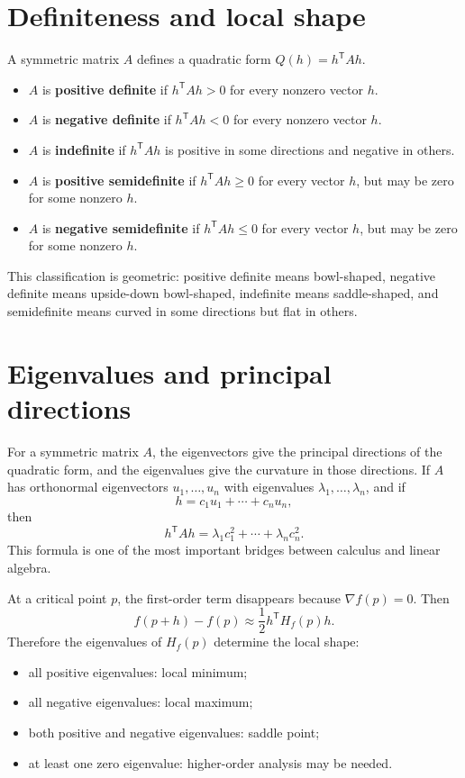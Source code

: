 \documentclass[11pt]{article}
\newcommand{\grad}{\nabla}
\newcommand{\T}{^{\mathsf T}}
\begin{document}
\section{Definiteness and local shape}

A symmetric matrix $A$ defines a quadratic form $Q(h)=h\T Ah$.
\begin{itemize}
  \item $A$ is \textbf{positive definite} if $h\T Ah>0$ for every nonzero vector $h$.
  \item $A$ is \textbf{negative definite} if $h\T Ah<0$ for every nonzero vector $h$.
  \item $A$ is \textbf{indefinite} if $h\T Ah$ is positive in some directions and negative in others.
  \item $A$ is \textbf{positive semidefinite} if $h\T Ah\ge 0$ for every vector $h$, but may be zero for some nonzero $h$.
  \item $A$ is \textbf{negative semidefinite} if $h\T Ah\le 0$ for every vector $h$, but may be zero for some nonzero $h$.
\end{itemize}

This classification is geometric: positive definite means bowl-shaped, negative definite means upside-down bowl-shaped, indefinite means saddle-shaped, and semidefinite means curved in some directions but flat in others.

\section{Eigenvalues and principal directions}

For a symmetric matrix $A$, the eigenvectors give the principal directions of the quadratic form, and the eigenvalues give the curvature in those directions. If $A$ has orthonormal eigenvectors $u_1,\ldots,u_n$ with eigenvalues $\lambda_1,\ldots,\lambda_n$, and if
\[
h=c_1u_1+\cdots+c_nu_n,
\]
then
\[
h\T Ah=\lambda_1c_1^2+\cdots+\lambda_n c_n^2.
\]
This formula is one of the most important bridges between calculus and linear algebra.

\begin{importantbox}
At a critical point $p$, the first-order term disappears because $\grad f(p)=0$. Then
\[
f(p+h)-f(p)\approx \frac12h\T H_f(p)h.
\]
Therefore the eigenvalues of $H_f(p)$ determine the local shape:
\begin{itemize}
  \item all positive eigenvalues: local minimum;
  \item all negative eigenvalues: local maximum;
  \item both positive and negative eigenvalues: saddle point;
  \item at least one zero eigenvalue: higher-order analysis may be needed.
\end{itemize}
\end{importantbox}
\end{document}
